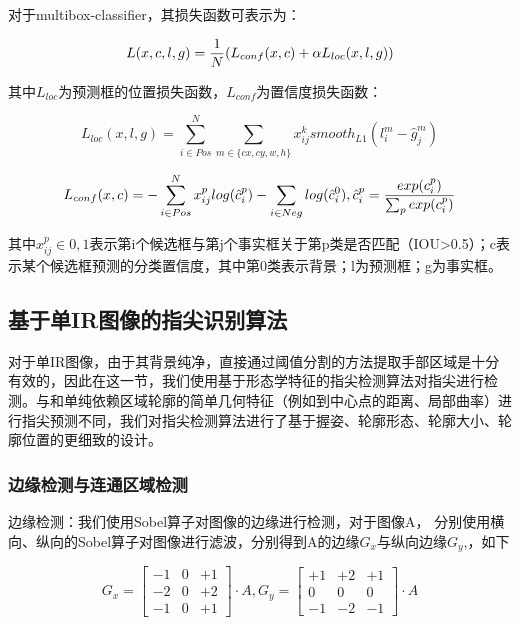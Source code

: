 对于multibox-classifier，其损失函数可表示为：

\begin{equation}
    L(x,c,l,g)={1 \over N}(L_{conf}(x,c) + \alpha L_{loc}(x,l,g))
\end{equation}

其中$L_{loc}$为预测框的位置损失函数，$L_{conf}$为置信度损失函数：

\begin{equation}
    L_{loc}(x,l,g)= \sum_{i \in Pos}^N \sum_{m \in \{cx, cy, w, h\}} x_{ij}^k smooth_{L1}(l_i^m-\hat{g}_j^m)
\end{equation}

\begin{equation}
    L_{conf}(x,c)=- \sum_{i \in Pos}^N x_{ij}^p log(\hat{c}_i^p) - \sum_{i \in Neg} log(\hat{c}_i^0), \hat{c}_i^p = {exp(c_i^p) \over {\sum_p exp(c_i^p)}}
\end{equation}

其中$x_{ij}^p \in {0,1}$表示第i个候选框与第j个事实框关于第p类是否匹配（IOU>0.5）；c表示某个候选框预测的分类置信度，其中第0类表示背景；l为预测框；g为事实框。

\subsection{基于单IR图像的指尖识别算法}
对于单IR图像，由于其背景纯净，直接通过阈值分割的方法提取手部区域是十分有效的，因此在这一节，我们使用基于形态学特征的指尖检测算法对指尖进行检测。与和单纯依赖区域轮廓的简单几何特征（例如到中心点的距离、局部曲率）进行指尖预测不同，我们对指尖检测算法进行了基于握姿、轮廓形态、轮廓大小、轮廓位置的更细致的设计。

\subsubsection{边缘检测与连通区域检测}

边缘检测：我们使用Sobel算子对图像的边缘进行检测，对于图像A，  分别使用横向、纵向的Sobel算子对图像进行滤波，分别得到A的边缘$G_x$与纵向边缘$G_y$,，如下

\begin{equation}
    G_x = \left[
    \begin{matrix}
        -1 & 0 & +1 \\
        -2 & 0 & +2 \\
        -1 & 0 & +1
    \end{matrix}
    \right] \cdot A,
    G_y = \left[
    \begin{matrix}
        +1 & +2 & +1 \\
        0 & 0 & 0 \\
        -1 & -2 & -1
    \end{matrix}
    \right] \cdot A
\end{equation}


